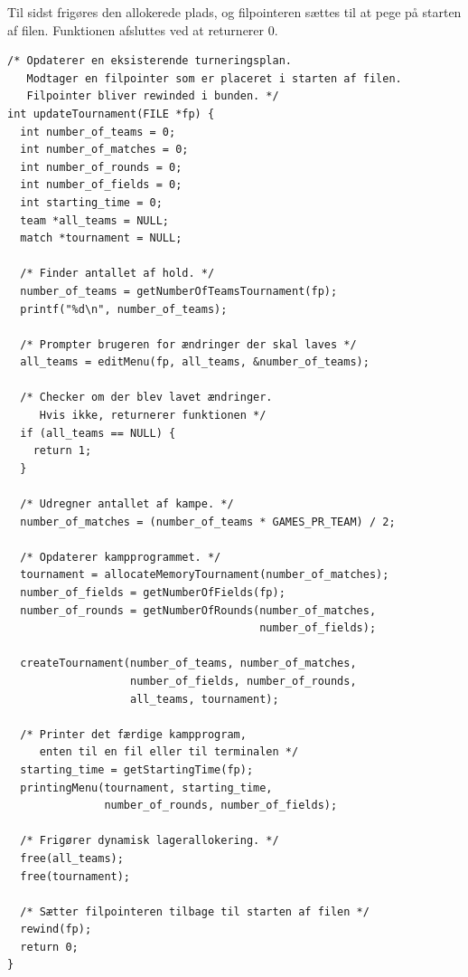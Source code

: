 \par
Til sidst frigøres den allokerede plads, og filpointeren sættes til at pege på starten af filen. Funktionen afsluttes ved at returnerer 0. 
\begin{listing}[H]
\begin{verbatim}
/* Opdaterer en eksisterende turneringsplan. 
   Modtager en filpointer som er placeret i starten af filen. 
   Filpointer bliver rewinded i bunden. */
int updateTournament(FILE *fp) {
  int number_of_teams = 0;
  int number_of_matches = 0;
  int number_of_rounds = 0;
  int number_of_fields = 0;
  int starting_time = 0;
  team *all_teams = NULL;
  match *tournament = NULL;

  /* Finder antallet af hold. */
  number_of_teams = getNumberOfTeamsTournament(fp);
  printf("%d\n", number_of_teams);

  /* Prompter brugeren for ændringer der skal laves */
  all_teams = editMenu(fp, all_teams, &number_of_teams);

  /* Checker om der blev lavet ændringer. 
     Hvis ikke, returnerer funktionen */
  if (all_teams == NULL) {
    return 1;
  }

  /* Udregner antallet af kampe. */
  number_of_matches = (number_of_teams * GAMES_PR_TEAM) / 2;

  /* Opdaterer kampprogrammet. */
  tournament = allocateMemoryTournament(number_of_matches);
  number_of_fields = getNumberOfFields(fp);
  number_of_rounds = getNumberOfRounds(number_of_matches, 
                                       number_of_fields);
                                       
  createTournament(number_of_teams, number_of_matches, 
                   number_of_fields, number_of_rounds, 
                   all_teams, tournament);

  /* Printer det færdige kampprogram, 
     enten til en fil eller til terminalen */
  starting_time = getStartingTime(fp);
  printingMenu(tournament, starting_time, 
               number_of_rounds, number_of_fields);

  /* Frigører dynamisk lagerallokering. */
  free(all_teams);
  free(tournament);

  /* Sætter filpointeren tilbage til starten af filen */
  rewind(fp);
  return 0;
}
\end{verbatim}
\label{code:updateTournament}
\end{listing}

